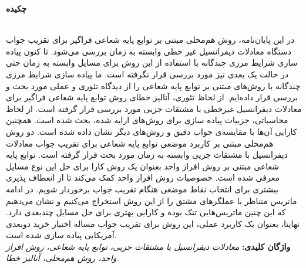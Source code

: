 %
%
%
%
\thispagestyle{empty}
\noindent
\centerline{\textbf{\large{چکیده}}} \\
در این پایان‌نامه، روش هم‌محلی مبتنی بر توابع پایه شعاعی فراگیر برای تقریب جواب دستگاه‌ معادلات دیفرانسیل غیر خطی وابسته به زمان بررسی می‌شود. تا کنون پیاده سازی شرایط مرزی چندگانه با استفاده از این روش برای مسایل وابسته به زمان حتی در حالت یک بعدی نیز مورد بررسی قرار نگرفته است. ما پیاده سازی شرایط مرزی چندگانه با روش‌های مبتنی بر توابع پایه شعاعی را از دیدگاه تئوری و عملی مورد بحث و بررسی قرار داده‌ایم. از لحاظ تئوری، آنالیز خطای روش توابع پایه شعاعی فراگیر برای معادلات دیفرانسیل غیرخطی با مشتقات جزیی مورد بررسی قرار گرفته است. از لحاظ محاسباتی، جزییات پیاده سازی برای روش‌های ارایه شده، بحث شده است. همچنین کارایی آن‌ها با مقایسه‌ی جواب دقیق و روش‌های دیگر  نشان داده شده است. دو روش هم‌محلی مبتنی بر کاربرد موضعی توابع پایه شعاعی برای تقریب جواب معادلات دیفرانسیل با مشتقات جزیی وابسته به زمان مورد بحث قرار گرفته است. توابع پایه شعاعی مبتنی بر روش افراز واحد بعنوان یک روش کارا برای حل این نوع مسایل معرفی شده است. خصوصیات روش افراز واحد کمک می‌کند تا از انعطاف پذیری بیشتری برای انتخاب نقاط موضعی هنگام تقریب جواب برخوردار شویم. در ادامه ماتریس متناظر با عملگرهای مشتق را از این روش استخراج می‌کنیم و نشان می‌دهیم که این چنین ماتریس‌هایی تنک بوده و کارایی بهتری برای حل مسایل  چندبعدی دارد. نهایتا، بعنوان یک کاربرد عملی، این روش برای تقریب جواب مساله اختیار خرید دوبعدی آمریکایی پیاده سازی شده است.
\\

\noindent
\textbf{واژگان کلیدی:} 
\emph
{معادلات دیفرانسیل با مشتقات جزیی، توابع پایه شعاعی، روش افراز واحد، روش هم‌محلی، آنالیز خطا.}